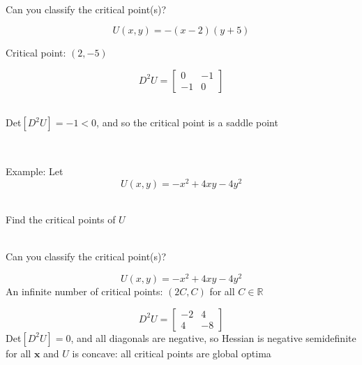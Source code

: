 \documentclass[10pt]{seminar}
\begin{document}
\begin{slide}
\ \\Can you classify the critical point(s)?

\newslide

$$U(x, y)= -(x-2)(y+5)$$

Critical point: $(2, -5)$

$$D^2 U=
\begin{bmatrix}
0& -1\\
-1& 0
\end{bmatrix}
$$

\ \\Det$[D^2 U]=-1<0$, and so the critical point is a saddle point

\ \\ \begin{center}
\end{center}

\newslide
Example: Let $$U(x, y)= -x^2+4xy-4y^2$$

\ \\Find the critical points of $U$

\ \\Can you classify the critical point(s)?

\newslide
$$U(x, y)= -x^2+4xy-4y^2$$
An infinite number of critical points:  $(2C, C)$ for all $C\in \mathbb{R}$

$$D^2 U=
\begin{bmatrix}
-2& 4\\
4& -8
\end{bmatrix}
$$
Det$[D^2 U]=0$, and all diagonals are negative, so Hessian is negative semidefinite for all $\mathbf{x}$ and $U$ is concave: all critical points are global optima
 \begin{center}
\end{center}


 \end{slide}
 
 
\end{document}

